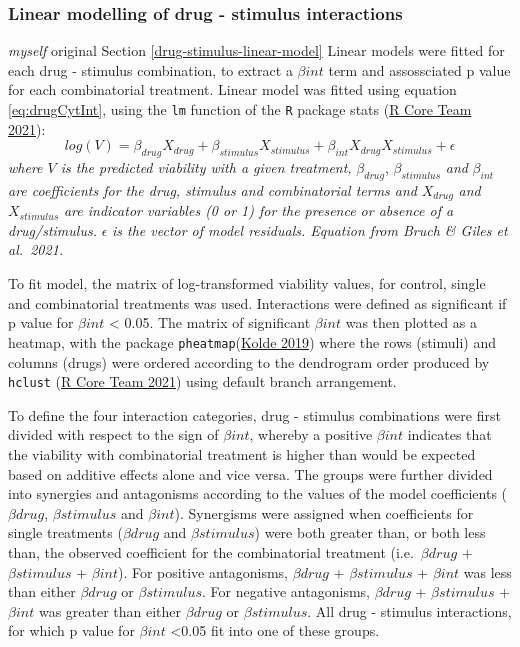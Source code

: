 \documentclass[11pt, a4paper, twosided]{book}
\begin{document}
\hypertarget{drug-stimulus-linear-model-method}{%
\subsubsection{Linear modelling of drug - stimulus interactions}\label{drug-stimulus-linear-model-method}}

\emph{myself} original
Section \ref{drug-stimulus-linear-model} Linear models were fitted for each drug - stimulus combination, to extract a \(\beta{int}\) term and assossciated p value for each combinatorial treatment. Linear model was fitted using equation \eqref{eq:drugCytInt}, using the \texttt{lm} function of the \texttt{R} package stats (\protect\hyperlink{ref-R-base}{R Core Team 2021}):
\begin{equation}
            log(V) = \beta_{drug}X_{drug} + \beta_{stimulus}X_{stimulus} + \beta_{int}X_{drug}X_{stimulus} + \epsilon
                                       \label{eq:drugCytInt}
    \end{equation}
\emph{where \(V\) is the predicted viability with a given treatment,} \(\beta_{drug}\), \(\beta_{stimulus}\) \emph{and} \(\beta_{int}\) \emph{are coefficients for the drug, stimulus and combinatorial terms and} \(X_{drug}\) \emph{and} \(X_{stimulus}\) \emph{are indicator variables (0 or 1) for the presence or absence of a drug/stimulus.} \(\epsilon\) \emph{is the vector of model residuals. Equation from Bruch \& Giles et al.~2021.}

To fit model, the matrix of log-transformed viability values, for control, single and combinatorial treatments was used. Interactions were defined as significant if p value for \(\beta{int}\) \textless{} 0.05. The matrix of significant \(\beta{int}\) was then plotted as a heatmap, with the package \texttt{pheatmap}(\protect\hyperlink{ref-R-pheatmap}{Kolde 2019}) where the rows (stimuli) and columns (drugs) were ordered according to the dendrogram order produced by \texttt{hclust} (\protect\hyperlink{ref-R-base}{R Core Team 2021}) using default branch arrangement.

To define the four interaction categories, drug - stimulus combinations were first divided with respect to the sign of \(\beta{int}\), whereby a positive \(\beta{int}\) indicates that the viability with combinatorial treatment is higher than would be expected based on additive effects alone and vice versa. The groups were further divided into synergies and antagonisms according to the values of the model coefficients (\(\beta{drug}\), \(\beta{stimulus}\) and \(\beta{int}\)). Synergisms were assigned when coefficients for single treatments (\(\beta{drug}\) and \(\beta{stimulus}\)) were both greater than, or both less than, the observed coefficient for the combinatorial treatment (i.e.~\(\beta{drug}\) + \(\beta{stimulus}\) + \(\beta{int}\)). For positive antagonisms, \(\beta{drug}\) + \(\beta{stimulus}\) + \(\beta{int}\) was less than either \(\beta{drug}\) or \(\beta{stimulus}\). For negative antagonisms, \(\beta{drug}\) + \(\beta{stimulus}\) + \(\beta{int}\) was greater than either \(\beta{drug}\) or \(\beta{stimulus}\). All drug - stimulus interactions, for which p value for \(\beta{int}\) \textless0.05 fit into one of these groups.
\end{document}

